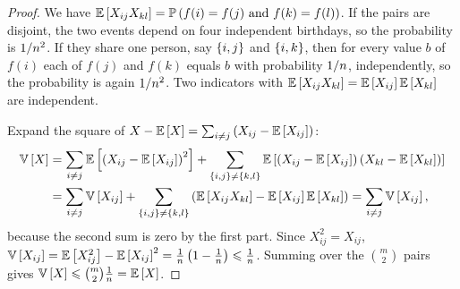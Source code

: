 \begin{proof}
    We have $\expectation{X_{ij} X_{kl}} = \prob{f(i) = f(j) \text{ and } f(k) = f(l)}$. If the
    pairs are disjoint, the two events depend on four independent birthdays, so the probability is
    $1/n^2$. If they share one person, say $\left\lbrace i,j\right\rbrace$ and $\left\lbrace i,k\right\rbrace$, then for every
    value $b$ of $f(i)$ each of $f(j)$ and $f(k)$ equals $b$ with probability $1/n$,
    independently, so the probability is again $1/n^2$. Two indicators with
    $\expectation{X_{ij} X_{kl}} = \expectation{X_{ij}} \expectation{X_{kl}}$ are independent.

    Expand the square of
    $X - \expectation{X} = \sum_{i \neq j} \left(X_{ij} - \expectation{X_{ij}}\right)$:
    \begin{align*}
        \variance{X}
         & = \sum_{i \neq j} \expectation{\left(X_{ij} - \expectation{X_{ij}}\right)^2}
        + \sum_{\set{i,j} \neq \set{k,l}} \expectation{\left(X_{ij} - \expectation{X_{ij}}\right) \left(X_{kl} - \expectation{X_{kl}}\right)} \\
         & = \sum_{i \neq j} \variance{X_{ij}}
        + \sum_{\set{i,j} \neq \set{k,l}} \left(\expectation{X_{ij} X_{kl}} - \expectation{X_{ij}} \expectation{X_{kl}}\right)
        = \sum_{i \neq j} \variance{X_{ij}},
    \end{align*}
    because the second sum is zero by the first part. Since $X_{ij}^2 = X_{ij}$,
    $\variance{X_{ij}} = \expectation{X_{ij}^2} - \expectation{X_{ij}}^2
        = \frac{1}{n} \left(1 - \frac{1}{n}\right) \leq \frac{1}{n}$.
    Summing over the $\binom{m}{2}$ pairs gives
    $\variance{X} \leq \binom{m}{2} \frac{1}{n} = \expectation{X}$.
\end{proof}

